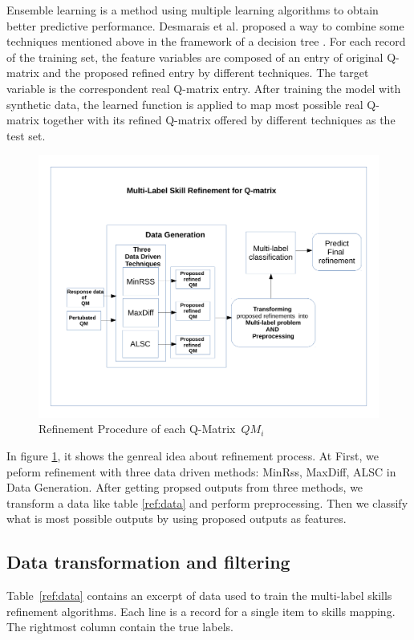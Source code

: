 \documentclass[12pt]{article}
\begin{document}
Ensemble learning is a method using multiple learning algorithms to obtain better predictive performance. Desmarais et al. proposed a way to combine some techniques mentioned above in the framework of a decision tree \cite{desmarais2015combining}. For each record of the training set, the feature variables are composed of an entry of original Q-matrix and the proposed refined entry by different techniques. The target variable is the correspondent real Q-matrix entry. After training the model with synthetic data, the learned function is applied to map most possible real Q-matrix together with its refined Q-matrix offered by different techniques as the test set. 

 
 \begin{figure}
  \centering
    \includegraphics[width=100 mm ,scale=0.5]{graph/RP.pdf}
  \caption{Refinement Procedure of each Q-Matrix~$QM_i$ }\label{fig:RP}
\end{figure} 
  In figure \ref{fig:RP}, it shows the genreal idea about refinement process. At First, we peform refinement with three data driven methods: MinRss, MaxDiff, ALSC in Data Generation. After getting propsed outputs from three methods, we transform a data like table \ref{ref:data} and perform preprocessing. Then we classify what is most possible outputs by using proposed outputs as features.

\subsection{Data transformation and filtering}



Table~\ref{ref:data} contains an excerpt of data used to train the multi-label skills refinement algorithms. Each line is a record for a single item to skills mapping. The rightmost column contain the true labels. 
\end{document}
